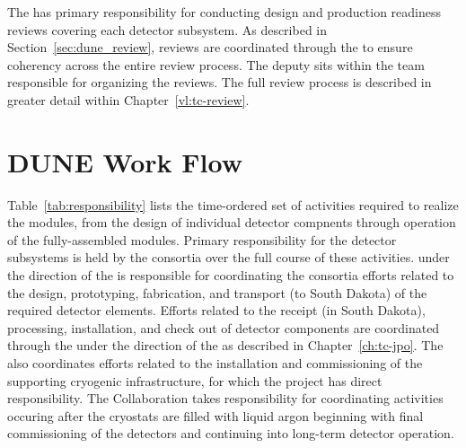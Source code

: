 The  has primary responsibility for conducting design
and production readiness reviews covering each detector subsystem.
As described in Section~\ref{sec:dune_review}, reviews are coordinated
through the  to ensure coherency across the entire review
process.  The deputy  sits within the  team
responsible for organizing the reviews.  The full review process is
described in greater detail within Chapter~\ref{vl:tc-review}.

\section{DUNE Work Flow}
\label{sec:workflow}

Table~\ref{tab:responsibility} lists the time-ordered set of activities 
required to realize the   modules, from the design 
of individual detector compnents through operation of the fully-assembled 
modules.  Primary responsibility for the detector subsystems is held 
by the  consortia over the full course of these activities.
  under the direction of the  is 
responsible for coordinating the consortia efforts related to the design, 
prototyping, fabrication, and transport (to South Dakota) of the required 
detector elements.  Efforts related to the receipt (in South Dakota), 
processing, installation, and check out of detector components are coordinated 
through the  under the direction of the  as 
described in Chapter~\ref{ch:tc-jpo}.  The  also coordinates 
efforts related to the installation and commissioning of the supporting
cryogenic infrastructure, for which the  project has direct 
responsibility.  The  Collaboration takes responsibility 
for coordinating activities occuring after the cryostats are filled 
with liquid argon beginning with final commissioning of the detectors 
and continuing into long-term detector operation.
